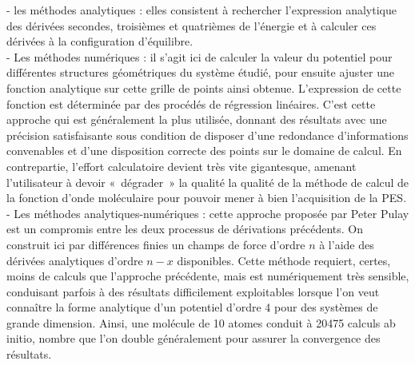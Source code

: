 - les méthodes analytiques : elles consistent à rechercher l’expression analytique des dérivées secondes, troisièmes et quatrièmes de l’énergie et à calculer ces dérivées à la configuration d’équilibre.\\ 
- Les méthodes numériques : il s’agit ici de calculer la valeur du potentiel pour différentes structures géométriques du système étudié, pour ensuite ajuster une fonction analytique sur cette grille de points ainsi obtenue. L’expression de cette fonction est déterminée par des procédés de régression linéaires. C’est cette approche qui est généralement la plus utilisée, donnant des résultats avec une précision satisfaisante sous condition de disposer d’une redondance d’informations convenables et d’une disposition correcte des points sur le domaine de calcul. En contrepartie, l’effort calculatoire devient très vite gigantesque, amenant l’utilisateur à devoir « dégrader » la qualité la qualité de la méthode de calcul de la fonction d’onde moléculaire pour pouvoir mener à bien l’acquisition de la PES.\\
- Les méthodes analytiques-numériques : cette approche proposée par Peter Pulay \cite{pulay1969ab} est un compromis entre les deux processus de dérivations précédents. On construit ici par différences finies un champs de force d’ordre $n$ à l’aide des dérivées analytiques d’ordre $n-x$ disponibles. Cette méthode requiert, certes, moins de calculs que l’approche précédente, mais est numériquement très sensible, conduisant parfois à des résultats difficilement exploitables lorsque l’on veut connaître la forme analytique d’un potentiel d’ordre 4 pour des systèmes de grande dimension. Ainsi, une molécule de 10 atomes conduit à 20475 calculs ab initio, nombre que l’on double généralement pour assurer la convergence des résultats. 

